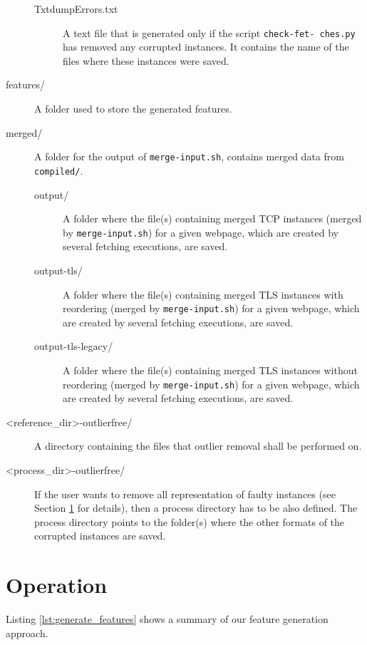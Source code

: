 \begin{description}
\begin{description}
\item[TxtdumpErrors.txt] A text file that is generated only if the script \texttt{check-fet- ches.py} has removed any corrupted instances. It contains the name of the files where these instances were saved.
\end{description}
\item[features/] A folder used to store the generated features.
\item[merged/] A folder for the output of \texttt{merge-input.sh}, contains merged data from \texttt{compiled/}.
\begin{description}
\item[output/] A folder where the file(s) containing merged \ac{TCP} instances (merged by \texttt{merge-input.sh}) for a given webpage, which are created by several fetching executions, are saved.
\item[output-tls/] A folder where the file(s) containing merged \ac{TLS} instances with reordering (merged by \texttt{merge-input.sh}) for a given webpage, which are created by several fetching executions, are saved.
\item[output-tls-legacy/] A folder where the file(s) containing merged \ac{TLS} instances without reordering (merged by \texttt{merge-input.sh}) for a given webpage, which are created by several fetching executions, are saved.
\end{description}
\item[<reference\_dir>-outlierfree/] A directory containing the files that outlier removal shall be performed on.
\item[<process\_dir>-outlierfree/] If the user wants to remove all representation of faulty instances (see Section \ref{sec:feature_operation} for details), then a process directory has to be also defined. The process directory points to the folder(s) where the other formats of the corrupted instances are saved.
\end{description}

\section{Operation}
\label{sec:feature_operation}

Listing \ref{lst:generate_features} shows a summary of our feature generation approach. 

